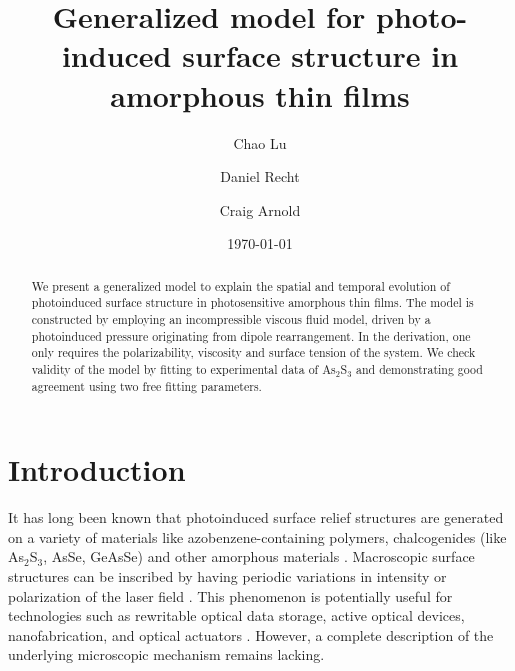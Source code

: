 \documentclass[aps, prl, twocolumn, groupedaddress]{revtex4-1}
\begin{document}

\title{Generalized model for photo-induced surface structure in amorphous
  thin films}

\author{Chao Lu}
\author{Daniel Recht}
\author{Craig Arnold}
\date{\today}

\begin{abstract}
We present a generalized model to explain the spatial and temporal
evolution of photoinduced surface structure in photosensitive
amorphous thin films. The model is constructed by employing an
incompressible viscous fluid model, driven by a photoinduced
pressure originating from dipole rearrangement. In the derivation, one
only requires the polarizability, viscosity and surface tension of
the system. We check validity of the model by fitting to experimental
data of As$_2$S$_3$ and demonstrating good agreement using two free
fitting parameters.

\end{abstract}

\maketitle

\section{\label{sec:intro}Introduction}
It has long been known that photoinduced surface relief structures are
generated on a variety of materials like azobenzene-containing
polymers, chalcogenides (like As$_2$S$_3$, AsSe, GeAsSe) and other
amorphous materials \cite{Viswanathan:1998jx, saliminia,
Shtutina:1995, Barada:2004dq}. Macroscopic surface structures can be
inscribed by having periodic variations in intensity or polarization
of the laser field \cite{Jiang:1998bz}. This phenomenon is potentially
useful for technologies such as rewritable optical data storage,
active optical devices, nanofabrication, and optical actuators
\cite{Kenji:2002, Kim:1995fb}. However, a complete description of the
underlying microscopic mechanism remains lacking.
\end{document}
